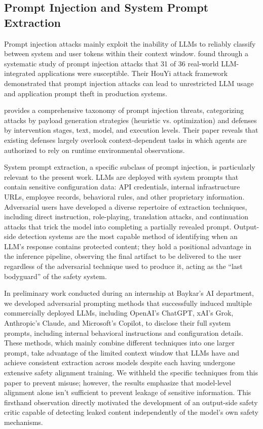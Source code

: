 \documentclass[11pt]{article}
\begin{document}
\subsection{Prompt Injection and System Prompt Extraction}
\label{sec:prompt-injection}

Prompt injection attacks mainly exploit the inability of LLMs to reliably classify between system
and user tokens within their context window. \citet{liu2023prompt} found through a systematic study of prompt
injection attacks that 31 of 36 real-world LLM-integrated applications were susceptible. Their
HouYi attack framework demonstrated that prompt injection attacks can lead to unrestricted LLM
usage and application prompt theft in production systems.

\citet{liu2024taxonomy} provides a comprehensive taxonomy of prompt injection threats, categorizing attacks by
payload generation strategies (heuristic vs. optimization) and defenses by intervention stages, text,
model, and execution levels. Their paper reveals that existing defenses largely overlook context-dependent tasks in which agents are authorized to rely on runtime environmental observations.

System prompt extraction, a specific subclass of prompt injection, is particularly relevant to
the present work. LLMs are deployed with system prompts that contain sensitive configuration
data: API credentials, internal infrastructure URLs, employee records, behavioral rules, and other
proprietary information. Adversarial users have developed a diverse repertoire of extraction techniques, including direct instruction, role-playing, translation attacks, and continuation attacks that
trick the model into completing a partially revealed prompt. Output-side detection systems are
the most capable method of identifying when an LLM's response contains protected content; they
hold a positional advantage in the inference pipeline, observing the final artifact to be delivered to
the user regardless of the adversarial technique used to produce it, acting as the ``last bodyguard''
of the safety system.

In preliminary work conducted during an internship at Baykar's AI department, we developed
adversarial prompting methods that successfully induced multiple commercially deployed LLMs,
including OpenAI's ChatGPT, xAI's Grok, Anthropic's Claude, and Microsoft's Copilot, to disclose their full system prompts, including internal behavioral instructions and configuration details.
These methods, which mainly combine different techniques into one larger prompt, take advantage
of the limited context window that LLMs have and achieve consistent extraction across models
despite each having undergone extensive safety alignment training. We withheld the specific techniques from this paper to prevent misuse; however, the results emphasize that model-level alignment
alone isn't sufficient to prevent leakage of sensitive information. This firsthand observation directly
motivated the development of an output-side safety critic capable of detecting leaked content independently of the model's own safety mechanisms.
\end{document}
